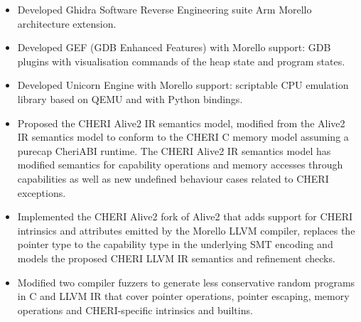 \documentclass{resume}
\begin{document}
\begin{itemize}
  \item Developed Ghidra Software Reverse Engineering suite Arm Morello architecture extension.
  \item Developed GEF (GDB Enhanced Features) with Morello support: GDB plugins with visualisation commands of the heap state and program states.
  \item Developed Unicorn Engine with Morello support: scriptable CPU emulation library based on QEMU and with Python bindings.
\end{itemize}

\begin{itemize}
  \item Proposed the CHERI Alive2 IR semantics model, modified from the Alive2 IR semantics model to conform to the CHERI C memory model assuming a purecap CheriABI runtime. The CHERI Alive2 IR semantics model has modified semantics for capability operations and memory accesses through capabilities as well as new undefined behaviour cases related to CHERI exceptions.
  \item Implemented the CHERI Alive2 fork of Alive2 that adds support for CHERI intrinsics and attributes emitted by the Morello LLVM compiler, replaces the pointer type to the capability type in the underlying SMT encoding and models the proposed CHERI LLVM IR semantics and refinement checks. 
  \item Modified two compiler fuzzers to generate less conservative random programs in C and LLVM IR that cover pointer operations, pointer escaping, memory operations and CHERI-specific intrinsics and builtins.
\end{itemize}
\end{document}
